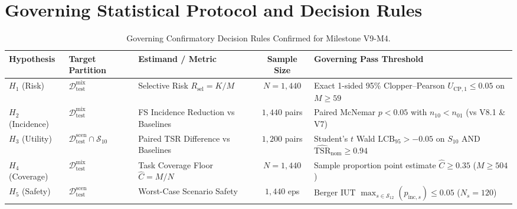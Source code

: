 \documentclass[10pt,a4paper]{article}
\begin{document}
\section{Governing Statistical Protocol and Decision Rules}

\begin{table}[h!]
\centering
\small
\begin{tabularx}{\textwidth}{l p{2.2cm} p{3.2cm} c p{4.2cm}}
\toprule
\textbf{Hypothesis} & \textbf{Target Partition} & \textbf{Estimand / Metric} & \textbf{Sample Size} & \textbf{Governing Pass Threshold} \\
\midrule
$H_1$ (Risk) & $\mathcal{D}_{\text{test}}^{\text{mix}}$ & Selective Risk $R_{\text{sel}} = K / M$ & $N = 1,440$ & Exact 1-sided 95\% Clopper--Pearson $U_{\mathrm{CP}, 1} \le \mathbf{0.05}$ on $M \ge 59$ \\
\addlinespace
$H_2$ (Incidence) & $\mathcal{D}_{\text{test}}^{\text{mix}}$ & FS Incidence Reduction vs Baselines & $1,440$ pairs & Paired McNemar $p < \mathbf{0.05}$ with $n_{10} < n_{01}$ (vs V8.1 \& V7) \\
\addlinespace
$H_3$ (Utility) & $\mathcal{D}_{\text{test}}^{\text{scen}} \cap \mathcal{S}_{10}$ & Paired TSR Difference vs Baselines & $1,200$ pairs & Student's $t$ Wald $\mathrm{LCB}_{95} > \mathbf{-0.05}$ on $S_{10}$ AND $\widehat{\mathrm{TSR}}_{\mathrm{nom}} \ge \mathbf{0.94}$ \\
\addlinespace
$H_4$ (Coverage) & $\mathcal{D}_{\text{test}}^{\text{mix}}$ & Task Coverage Floor $\hat{C} = M / N$ & $N = 1,440$ & Sample proportion point estimate $\hat{C} \ge \mathbf{0.35}$ ($M \ge 504$) \\
\addlinespace
$H_5$ (Safety) & $\mathcal{D}_{\text{test}}^{\text{scen}}$ & Worst-Case Scenario Safety & $1,440$ eps & Berger IUT $\max_{s \in \mathcal{S}_{12}}(p_{\mathrm{inc}, s}) \le \mathbf{0.05}$ ($N_s = 120$) \\
\bottomrule
\end{tabularx}
\caption{Governing Confirmatory Decision Rules Confirmed for Milestone V9-M4.}
\end{table}
\end{document}
